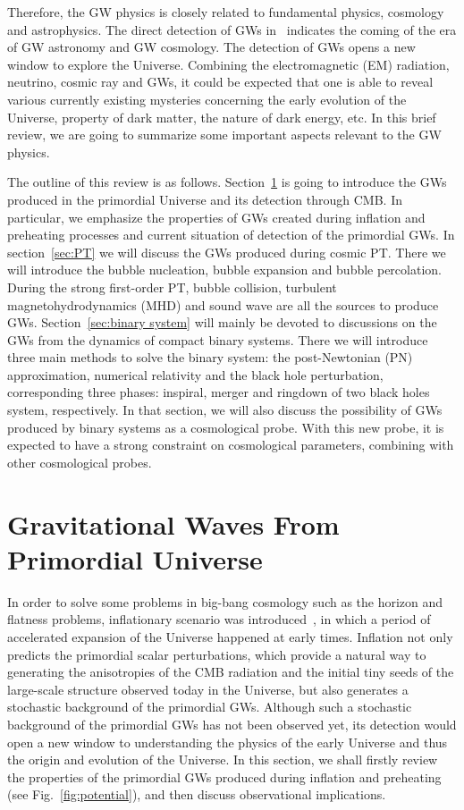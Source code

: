\documentclass[a4paper,11pt]{article}
\begin{document}
Therefore, the GW physics is closely related to fundamental physics, cosmology and astrophysics. The direct detection of GWs in~\cite{Abbott:2016blz,Abbott:2016nmj} indicates the coming of the era of GW astronomy and GW cosmology. The detection of GWs opens a new window to explore the Universe. Combining the electromagnetic (EM) radiation, neutrino, cosmic ray and GWs, it could be expected that one is able to reveal various currently existing mysteries concerning the early evolution of the Universe, property of dark matter, the nature of dark energy, etc. In this brief review, we are going to summarize some important aspects relevant to the GW physics.

The outline of this review is as follows. Section~\ref{sec:earlyuniverse} is going to introduce the GWs produced in the primordial Universe and its detection through CMB. In particular, we emphasize the properties of GWs created during inflation and preheating processes and current situation of detection of the primordial GWs. In section~\ref{sec:PT} we will discuss the GWs produced during cosmic PT. There we will introduce the bubble nucleation, bubble expansion and bubble percolation. During the strong first-order PT, bubble collision, turbulent magnetohydrodynamics (MHD) and sound wave are all the sources to produce GWs. Section~\ref{sec:binary system} will mainly be devoted to discussions on the GWs from the dynamics of compact binary systems. There we will introduce three main methods to solve the binary system: the post-Newtonian (PN) approximation, numerical relativity and the black hole perturbation, corresponding three phases: inspiral, merger and ringdown of two black holes system, respectively. In that section, we will also discuss the possibility of GWs produced by binary systems as a cosmological probe. With this new probe, it is expected to have a strong constraint on cosmological parameters, combining with other cosmological probes.


\section{Gravitational Waves From Primordial Universe}
\label{sec:earlyuniverse}

In order to solve some problems in big-bang cosmology such as the horizon and flatness problems, inflationary scenario was introduced~\cite{Guth:1980zm,Albrecht:1982wi,Linde:1981mu}, in which a period of accelerated expansion of the Universe happened at early times.
Inflation not only predicts the primordial scalar perturbations, which provide a natural way to generating the anisotropies of the CMB radiation and the initial tiny seeds of the large-scale structure observed today in the Universe, but also generates a stochastic background of the primordial GWs. Although such a stochastic background of the primordial GWs has not been observed yet, its detection would open a new window to understanding the physics of the early Universe and thus the origin and evolution of the Universe. In this section, we shall firstly review the properties of the primordial GWs produced during inflation and preheating (see Fig.~\ref{fig:potential}), and then discuss observational implications.
\end{document}
